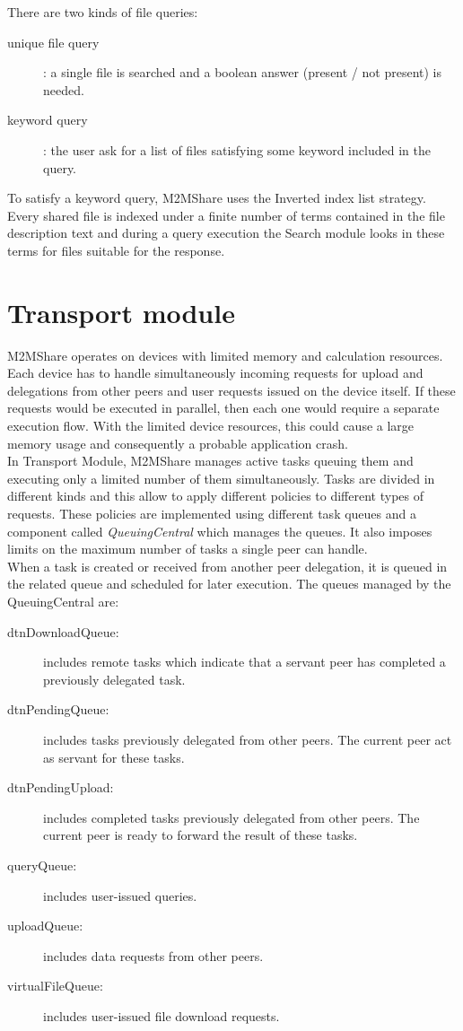 There are two kinds of file queries: 

\begin{description}
\item[unique file query]: a single file is searched and a boolean answer (present / not present) is needed.
\item[keyword query]: the user ask for a list of files satisfying some keyword included in the query.
\end{description}

To satisfy a keyword query, M2MShare uses the Inverted index list strategy. Every shared file is indexed under a finite number of terms contained in the file description text and during a query execution the Search module looks in these terms for files suitable for the response.


\section{Transport module}
M2MShare operates on devices with limited memory and calculation resources. Each device has to handle simultaneously incoming requests for upload and delegations from other peers and user requests issued on the device itself. If these requests would be executed in parallel, then each one would require a separate execution flow. With the limited device resources, this could cause a large memory usage and consequently a probable application crash. 
\\

In Transport Module, M2MShare manages active tasks queuing them and executing only a limited number of them simultaneously. Tasks are divided in different kinds and this allow to apply different policies to different types of requests. These policies are implemented using different task queues and a component called \textit{QueuingCentral} which manages the queues. It also imposes limits on the maximum number of tasks a single peer can handle.
\\

When a task is created or received from another peer delegation, it is queued in the related queue and scheduled for later execution. The queues managed by the QueuingCentral are:
\begin{description}
\item[dtnDownloadQueue:] includes remote tasks which indicate that a servant peer has completed a previously delegated task.
\item[dtnPendingQueue:] includes tasks previously delegated from other peers. The current peer act as servant for these tasks.
\item[dtnPendingUpload:] includes completed tasks previously delegated from other peers. The current peer is ready to forward the result of these tasks.
\item[queryQueue:] includes user-issued queries.
\item[uploadQueue:] includes data requests from other peers.
\item[virtualFileQueue:] includes user-issued file download requests.
\end{description}

